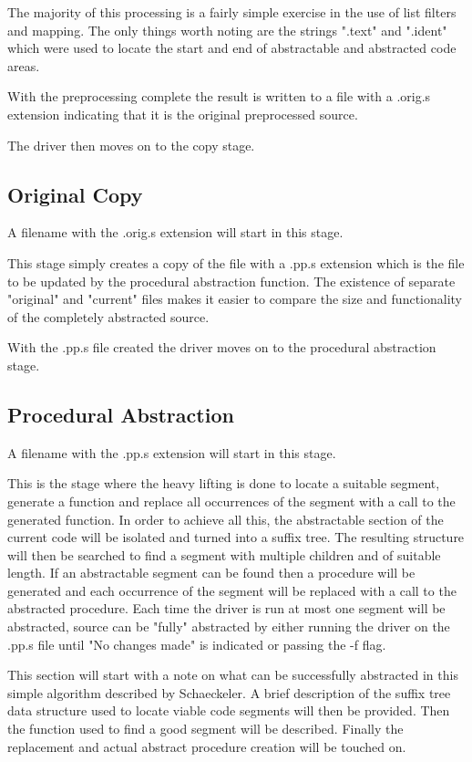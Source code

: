 \documentclass[9pt,nocopyrightspace]{sigplanconf}
\begin{document}
The majority of this processing is a fairly simple exercise in the use of list filters and mapping.
The only things worth noting are the strings ".text" and ".ident" which were used to locate the start and end of abstractable and abstracted code areas.

With the preprocessing complete the result is written to a file with a .orig.s extension indicating that it is the original preprocessed source.

The driver then moves on to the copy stage.

\subsection{Original Copy}

A filename with the .orig.s extension will start in this stage.

This stage simply creates a copy of the file with a .pp.s extension which is the file to be updated by the procedural abstraction function.
The existence of separate "original" and "current" files makes it easier to compare the size and functionality of the completely abstracted source.

With the .pp.s file created the driver moves on to the procedural abstraction stage.

\subsection{Procedural Abstraction}

A filename with the .pp.s extension will start in this stage.

This is the stage where the heavy lifting is done to locate a suitable segment, generate a function and replace all occurrences of the segment with a call to the generated function.
In order to achieve all this, the abstractable section of the current code will be isolated and turned into a suffix tree.
The resulting structure will then be searched to find a segment with multiple children and of suitable length.
If an abstractable segment can be found then a procedure will be generated and each occurrence of the segment will be replaced with a call to the abstracted procedure.
Each time the driver is run at most one segment will be abstracted, source can be "fully" abstracted by either running the driver on the .pp.s file until "No changes made" is indicated or passing the -f flag.

This section will start with a note on what can be successfully abstracted in this simple algorithm described by Schaeckeler\cite{theory01}.
A brief description of the suffix tree data structure used to locate viable code segments will then be provided.
Then the function used to find a good segment will be described.
Finally the replacement and actual abstract procedure creation will be touched on.
\end{document}
